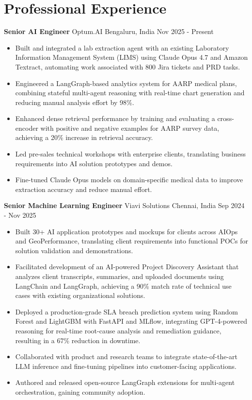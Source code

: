 \documentclass[10pt,a4paper]{article}
\newcommand{\role}[4]{\textbf{#1} \textbar{} #2 \hfill #3 \textbar{} #4\par}
\begin{document}
\section{Professional Experience}
\role{Senior AI Engineer}{Optum.AI}{Bengaluru, India}{Nov 2025 - Present}
\begin{itemize}
  \item Built and integrated a lab extraction agent with an existing Laboratory Information Management System (LIMS) using Claude Opus 4.7 and Amazon Textract, automating work associated with 800 Jira tickets and PRD tasks.
  \item Engineered a LangGraph-based analytics system for AARP medical plans, combining stateful multi-agent reasoning with real-time chart generation and reducing manual analysis effort by 98\%.
  \item Enhanced dense retrieval performance by training and evaluating a cross-encoder with positive and negative examples for AARP survey data, achieving a 20\% increase in retrieval accuracy.
  \item Led pre-sales technical workshops with enterprise clients, translating business requirements into AI solution prototypes and demos.
  \item Fine-tuned Claude Opus models on domain-specific medical data to improve extraction accuracy and reduce manual effort.
\end{itemize}
\vspace{3pt}
\role{Senior Machine Learning Engineer}{Viavi Solutions}{Chennai, India}{Sep 2024 - Nov 2025}
\begin{itemize}
  \item Built 30+ AI application prototypes and mockups for clients across AIOps and GeoPerformance, translating client requirements into functional POCs for solution validation and demonstrations.
  \item Facilitated development of an AI-powered Project Discovery Assistant that analyzes client transcripts, summaries, and uploaded documents using LangChain and LangGraph, achieving a 90\% match rate of technical use cases with existing organizational solutions.
  \item Deployed a production-grade SLA breach prediction system using Random Forest and LightGBM with FastAPI and MLflow, integrating GPT-4-powered reasoning for real-time root-cause analysis and remediation guidance, resulting in a 67\% reduction in downtime.
  \item Collaborated with product and research teams to integrate state-of-the-art LLM inference and fine-tuning pipelines into customer-facing applications.
  \item Authored and released open-source LangGraph extensions for multi-agent orchestration, gaining community adoption.
\end{itemize}
\end{document}
